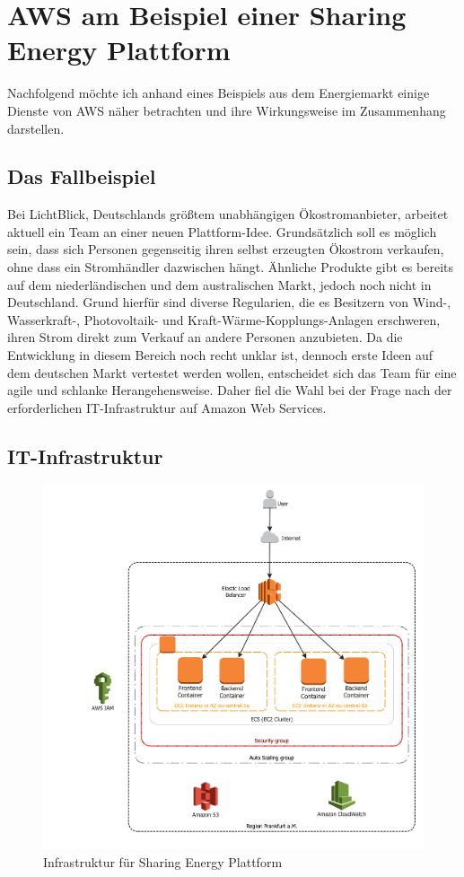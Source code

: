 \chapter{AWS am Beispiel einer Sharing Energy Plattform}\label{chapter:kapitellabel} %
Nachfolgend möchte ich anhand eines Beispiels aus dem Energiemarkt einige Dienste von AWS näher betrachten und ihre Wirkungsweise im Zusammenhang darstellen.

\section{Das Fallbeispiel}
\label{sec:fallbeispiel}
Bei LichtBlick, Deutschlands größtem unabhängigen Ökostromanbieter, arbeitet aktuell ein Team an einer neuen Plattform-Idee. Grundsätzlich soll es möglich sein, dass sich Personen gegenseitig ihren selbst erzeugten Ökostrom verkaufen, ohne dass ein Stromhändler dazwischen hängt. Ähnliche Produkte gibt es bereits auf dem niederländischen und dem australischen Markt, jedoch noch nicht in Deutschland. Grund hierfür sind diverse Regularien, die es Besitzern von Wind-, Wasserkraft-, Photovoltaik- und Kraft-Wärme-Kopplungs-Anlagen erschweren, ihren Strom direkt zum Verkauf an andere Personen anzubieten. Da die Entwicklung in diesem Bereich noch recht unklar ist, dennoch erste Ideen auf dem deutschen Markt vertestet werden wollen, entscheidet sich das Team für eine agile und schlanke Herangehensweise. Daher fiel die Wahl bei der Frage nach der erforderlichen IT-Infrastruktur auf Amazon Web Services.

\pagebreak
\section{IT-Infrastruktur}
\label{sec:infrastruktur}

\begin{figure}[!ht]
  \centering
  \includegraphics[width=1.0\textwidth]{images/peero.png}
  \caption{Infrastruktur für Sharing Energy Plattform }
\end{figure}

